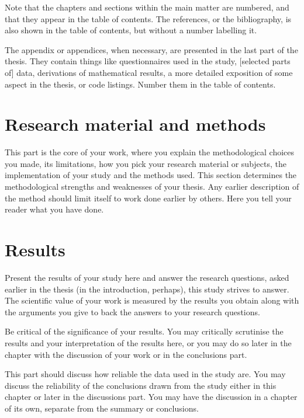 \documentclass[english, 12pt, a4paper, elec, utf8, a-2b, online]{aaltothesis}
\begin{document}
Note that the chapters and sections within the main matter are 
numbered, and that they appear in the table of contents. The references, or the 
bibliography, is also shown in the table of contents, but without a number 
labelling it.

The appendix or appendices, when necessary, are presented in the last part of
the thesis. They contain things like questionnaires used in the study, 
[selected parts of] data, derivations of mathematical results, a more detailed 
exposition of some aspect in the thesis, or code listings. Number them in the 
table of contents.


\clearpage

\section{Research material and methods}

This part is the core of your work, where you explain the methodological choices
you made, its limitations, how you pick your research material or subjects, the 
implementation of your study and the methods used. This section determines the 
methodological strengths and weaknesses of your thesis. Any earlier description 
of the method should limit itself to work done earlier by others. Here you tell 
your reader what you have done.

\clearpage

\section{Results}

Present the results of your study here and answer the research questions, asked 
earlier in the thesis (in the introduction, perhaps), this study strives to 
answer. The scientific value of your work is measured by the results you obtain 
along with the arguments you give to back the answers to your research 
questions.

Be critical of the significance of your results. You may critically scrutinise 
the results and your interpretation of the results here, or you may do so later 
in the chapter with the discussion of your work or in the conclusions part.

This part should discuss how reliable the data used in the study are. You may 
discuss the reliability of the conclusions drawn from the study either in this 
chapter or later in the discussions part. You may have the discussion in a 
chapter of its own, separate from the summary or conclusions.
\end{document}

